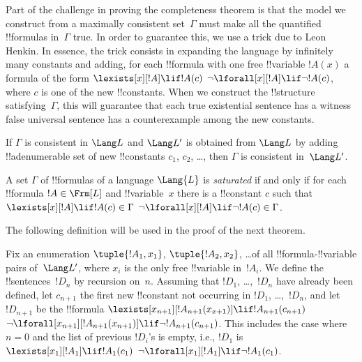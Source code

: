\documentclass[../../include/open-logic-section]{subfiles}
\begin{document}


\begin{explain}
Part of the challenge in proving the completeness theorem is that the
model we construct from a maximally consistent set~$\Gamma$ must make
all the quantified !!{formula}s in~$\Gamma$ true.  In order to
guarantee this, we use a trick due to Leon Henkin.  In essence, the
trick consists in expanding the language by infinitely many constants
and adding, for each !!{formula} with one free !!{variable} $!A(x)$ a
formula of the form 
      {$\lexists[x][!A] \lif !A(c)$}
      {$\lnot\lforall[x][!A] \lif \lnot !A(c)$},
where $c$ is one of the new !!{constant}s.  When we construct the
!!{structure} satisfying~$\Gamma$, this will guarantee that each
{true existential sentence has a witness}
{false universal sentence has a counterexample}
among the new constants.
\end{explain}

\begin{lem}
If $\Gamma$ is consistent in $\Lang L$ and $\Lang L'$ is obtained from
$\Lang L$ by adding !!a{denumerable} set of new !!{constant}s $c_1$,
$c_2$, \dots, then $\Gamma$ is consistent in~$\Lang L'$.
\end{lem}

\begin{defn}
A set $\Gamma$ of !!{formula}s of a language $\Lang {L}$ is
\emph{saturated} if and only if for each !!{formula} $!A \in \Frm[L]$
and !!{variable}~$x$ there is a !!{constant} $c$ such that
      {$\lexists[x][!A] \lif !A(c) \in \Gamma$}
      {$\lnot\lforall[x][!A] \lif \lnot !A(c) \in \Gamma$}.
\end{defn}

The following definition will be used in the proof of the next theorem.

\begin{defn}
Fix an enumeration $\tuple{!A_1, x_1}$, $\tuple{!A_2, x_2}$, \dots of
all !!{formula}-!!{variable} pairs of~$\Lang L'$, where $x_i$ is the
only free !!{variable} in~$!A_i$.  We define the !!{sentence}s~$!D_n$
by recursion on~$n$. Assuming that $!D_1$, \dots,~$!D_n$ have already
been defined, let $c_{n+1}$ the first new !!{constant} not occurring
in $!D_1$, \dots,~$!D_n$, and let $!D_{n+1}$ be the !!{formula}
 {$\lexists[x_{n+1}][!A_{n+1}(x_{x+1})] \lif
  !A_{n+1}(c_{n+1})$} {$\lnot\lforall[x_{n+1}][!A_{n+1}(x_{n+1})] \lif
  \lnot !A_{n+1}(c_{n+1})$}.  This includes the case where $n = 0$ and
the list of previous $!D_i$'s is empty, i.e., $!D_1$ is 
{$\lexists[x_1][!A_1] \lif !A_1(c_1)$} 
{$\lnot\lforall[x_1][!A_1] \lif \lnot !A_1(c_1)$}.
\end{defn}
\end{document}
